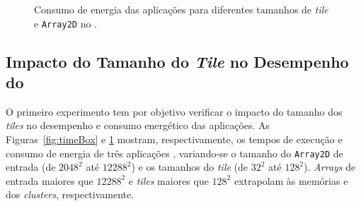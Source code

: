 \begin{figure}[t]
	\centering
	\quad
    	\quad
	\caption{Consumo de energia das aplicações para diferentes tamanhos de \textit{tile} e \texttt{Array2D} no \mppa.}
	\label{fig:energyBox}
\end{figure}


\subsection{Impacto do Tamanho do \textit{Tile} no Desempenho do \mppa}

O primeiro experimento tem por objetivo verificar o impacto do tamanho dos
\textit{tiles} no desempenho e consumo energético das aplicações. As
Figuras~\ref{fig:timeBox} e \ref{fig:energyBox} mostram, respectivamente, os
tempos de execução e consumo de energia de três aplicações \stencil, variando-se
o tamanho do \texttt{Array2D} de entrada (de $2048^2$ até $12288^2$) e os
tamanhos do \textit{tile} (de $32^2$ até $128^2$). \textit{Arrays} de entrada
maiores que $12288^2$ e \textit{tiles} maiores que $128^2$ extrapolam às
memórias \lpddr e dos \textit{clusters}, respectivamente.

